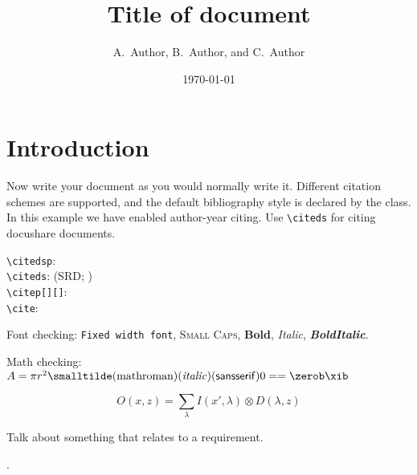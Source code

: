 \documentclass[DM,lsstdraft,authoryear,toc]{lsstdoc}
\title[Short title]{Title of document}
\author{
A.~Author,
B.~Author,
and
C.~Author}
\date{\today}
\begin{document}
\maketitle

\section{Introduction}

Now write your document as you would normally write it.
Different citation schemes are supported, and the default bibliography style is declared by the class.
In this example we have enabled author-year citing.
Use \verb|\citeds| for citing docushare documents.

\verb|\citedsp|:  \\
\verb|\citeds|: (SRD; ) \\
\verb|\citep[][]|: \citep[e.g.,][are interesting]{2009arXiv0912.0201L,2016SPIE.9913E..0GJ} \\
\verb|\cite|: \cite{LPM-51,Wang:2011:QDS:2063348.2063364}

Font checking: \texttt{Fixed width font}, \textsc{Small Caps}, \textbf{Bold}, \textit{Italic}, \textbf{\textit{BoldItalic}}.

Math checking: $A = \pi r^2 \smalltilde\mathrm{(math roman)}\mathit{(italic)}\mathsf{(sans serif)} 0 == \zerob \xib$

\begin{equation}
O(x, z) = \sum_\lambda I(x',\lambda) \otimes D(\lambda, z)
\end{equation}

Talk about something that relates to a requirement.

 .


\end{document}
